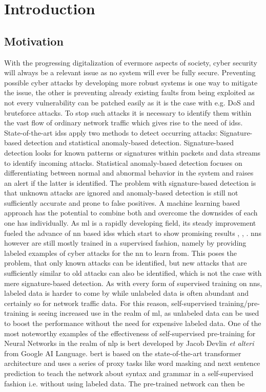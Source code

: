 \chapter{Introduction}

\section{Motivation} \label{sect.motivation}

With the progressing digitalization of evermore aspects of society, cyber security will always be a relevant issue as no system will ever be fully secure. Preventing possible cyber attacks by developing more robust systems is one way to mitigate the issue, the other is preventing already existing faults from being exploited as not every vulnerability can be patched easily as it is the case with e.g. DoS and bruteforce attacks. To stop such attacks it is necessary to identify them within the vast flow of ordinary network traffic which gives rise to the need of \glspl{ids}. State-of-the-art \glspl{ids} apply two methods to detect occurring attacks: Signature-based detection and statistical anomaly-based detection. Signature-based detection looks for known patterns or signatures within packets and data streams to identify incoming attacks. Statistical anomaly-based detection focuses on differentiating between normal and abnormal behavior in the system and raises an alert if the latter is identified. The problem with signature-based detection is that unknown attacks are ignored and anomaly-based detection is still not sufficiently accurate and prone to false positives. A machine learning based approach has the potential to combine both and overcome the downsides of each one has individually. As \gls{ml} is a rapidly developing field, its steady improvement fueled the advance of \gls{nn} based \glspl{ids} which start to show promising results \cite{fog_based_detection_survey_2020}, \cite{kitsune}, \cite{ml_ids_survey}. \glspl{nn} however are still mostly trained in a supervised fashion, namely by providing labeled examples of cyber attacks for the \gls{nn} to learn from. This poses the problem, that only known attacks can be identified, but new attacks that are sufficiently similar to old attacks can also be identified, which is not the case with mere signature-based detection. As with every form of supervised training on \glspl{nn}, labeled data is harder to come by while unlabeled data is often abundant and certainly so for network traffic data. For this reason, self-supervised training/pre-training is seeing increased use in the realm of \gls{ml}, as unlabeled data can be used to boost the performance without the need for expensive labeled data. One of the most noteworthy examples of the effectiveness of self-supervised pre-training for Neural Networks in the realm of \gls{nlp} is \gls{bert} \cite{bert} developed by Jacob Devlin \textit{et alteri} from Google AI Language. \gls{bert} is based on the state-of-the-art transformer architecture \cite{attention} and uses a series of proxy tasks like word masking and next sentence prediction to teach the network about syntax and grammar in a self-supervised fashion i.e. without using labeled data. The pre-trained network can then be 